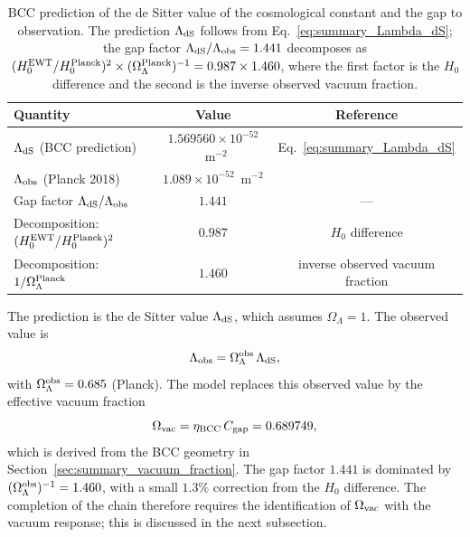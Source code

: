 \documentclass[10pt,a4paper]{article}
\begin{document}
\begin{table}[h]
	\centering
	\small
	\caption{BCC prediction of the de Sitter value of the
		cosmological constant and the gap to observation. The prediction
		\(\Lambda_{\rm dS}\) follows from Eq.~\eqref{eq:summary_Lambda_dS};
		the gap factor \(\Lambda_{\rm dS}/\Lambda_{\rm obs} = 1.441\)
		decomposes as
		\((H_0^{\rm EWT}/H_0^{\rm Planck})^2 \times (\Omega_\Lambda^{\rm Planck})^{-1}
		= 0.987 \times 1.460\), where the first factor is the \(H_0\)
		difference and the second is the inverse observed vacuum fraction.}
	\label{tab:summary_Lambda_dS}
	\begin{tabular}{lcc}
		\toprule
		\textbf{Quantity} & \textbf{Value} & \textbf{Reference} \\
		\midrule
		\(\Lambda_{\rm dS}\) (BCC prediction) & \(1.569560\times 10^{-52}\)~m\(^{-2}\) & Eq.~\eqref{eq:summary_Lambda_dS} \\
		\(\Lambda_{\rm obs}\) (Planck 2018)    & \(1.089\times 10^{-52}\)~m\(^{-2}\)    & \cite{Planck2018} \\
		Gap factor \(\Lambda_{\rm dS}/\Lambda_{\rm obs}\) & \(1.441\) & --- \\
		\midrule
		Decomposition: \((H_0^{\rm EWT}/H_0^{\rm Planck})^2\) & \(0.987\) & $H_0$ difference \\
		Decomposition: \(1/\Omega_\Lambda^{\rm Planck}\)     & \(1.460\) & inverse observed vacuum fraction \\
		\bottomrule
	\end{tabular}
\end{table}

The prediction is the de Sitter value \(\Lambda_{\rm dS}\), which
assumes \(\Omega_\Lambda = 1\). The observed value is
\begin{equation}
	\Lambda_{\rm obs} = \Omega_\Lambda^{\rm obs}\, \Lambda_{\rm dS},
	\label{eq:summary_Lambda_relation}
\end{equation}
with \(\Omega_\Lambda^{\rm obs} = 0.685\) (Planck). The model replaces
this observed value by the effective vacuum fraction
\begin{equation}
	\Omega_{\rm vac} = \eta_{\rm BCC}\, C_{\rm gap} = 0.689749,
	\label{eq:summary_omega_intro}
\end{equation}
which is derived from the BCC geometry in
Section~\ref{sec:summary_vacuum_fraction}. The gap factor
\(1.441\) is dominated by
\((\Omega_\Lambda^{\rm obs})^{-1} = 1.460\), with a small \(1.3\%\)
correction from the \(H_0\) difference. The completion of the chain
therefore requires the identification of \(\Omega_{\rm vac}\) with
the vacuum response; this is discussed in the next subsection.
\end{document}
